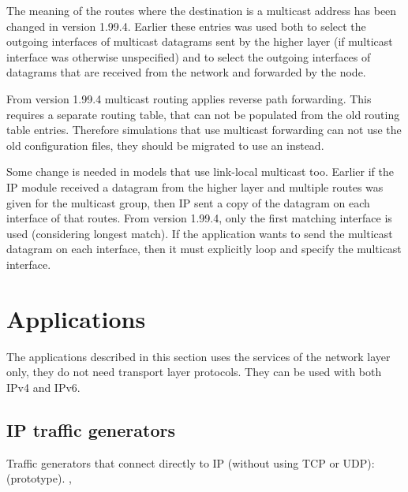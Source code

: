 \begin{important}
The meaning of the routes where the destination is a multicast address
has been changed in version 1.99.4. Earlier these entries was used
both to select the outgoing interfaces of multicast datagrams
sent by the higher layer (if multicast interface was otherwise unspecified)
and to select the outgoing interfaces of datagrams that are received from
the network and forwarded by the node.

From version 1.99.4 multicast routing applies reverse path forwarding.
This requires a separate routing table, that can not be populated from
the old routing table entries. Therefore simulations that use multicast
forwarding can not use the old configuration files, they should be
migrated to use an  instead.

Some change is needed in models that use link-local multicast too.
Earlier if the IP module received a datagram from the higher layer
and multiple routes was given for the multicast group,
then IP sent a copy of the datagram on each interface of that routes.
From version 1.99.4, only the first matching interface is used (considering
longest match). If the application wants to send the multicast datagram
on each interface, then it must explicitly loop and specify the multicast
interface.  
\end{important}




\section{Applications}

The applications described in this section uses the services of the network
layer only, they do not need transport layer protocols.
They can be used with both IPv4 and IPv6.

\subsection{IP traffic generators}

Traffic generators that connect directly to IP (without using TCP or UDP):
 (prototype).
 ,

